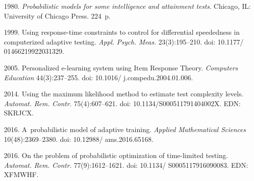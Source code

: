   \begin{multicols}{2}

\renewcommand{\bibname}{\protect\rmfamily References}

{\small\frenchspacing
 {%
 \begin{thebibliography}{99} 
 1980. \textit{Probabilistic models for some intelligence and attainment tests}. Chicago, 
IL: University of Chicago Press. 224~p.

 1999. Using response-time 
constraints to control for differential speededness in computerized adaptive testing. \textit{Appl. Psych. 
Meas.} 23(3):195--210. doi: 10.1177/ 01466219922031329.

 2005. Personalized e-learning system using Item 
Response Theory. \textit{Computers Education} 44(3):237--255. doi: 10.1016/ j.compedu.2004.01.006.

 2014. Using the maximum likelihood method to estimate 
test complexity levels. \textit{Automat. Rem. Contr.} 75(4):607--621. doi: 10.1134/S000511791404002X. 
EDN: SKRJCX.

 2016. A~probabilistic model of adaptive training. \textit{Applied Mathematical Sciences} 
 10(48):2369--2380. doi: 10.12988/ ams.2016.65168.

 2016. On the problem of probabilistic optimization of 
time-limited testing. \textit{Automat. Rem. Contr.} 77(9):1612--1621. doi: 10.1134/ S0005117916090083. 
EDN: XFMWHF.


\end{thebibliography}}}
\end{multicols}
